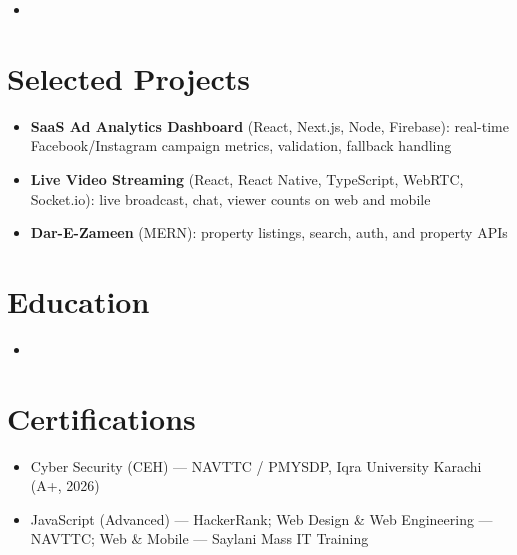 \documentclass[11pt,a4paper,sans]{moderncv}
\begin{document}
\begin{itemize}
\vspace{3pt}

\item{}

\end{itemize}

\section{Selected Projects}
\vspace{1pt}
\begin{itemize}
\item \textbf{SaaS Ad Analytics Dashboard} (React, Next.js, Node, Firebase): real-time Facebook/Instagram campaign metrics, validation, fallback handling
\item \textbf{Live Video Streaming} (React, React Native, TypeScript, WebRTC, Socket.io): live broadcast, chat, viewer counts on web and mobile
\item \textbf{Dar-E-Zameen} (MERN): property listings, search, auth, and property APIs
\end{itemize}

\section{Education}
\vspace{1pt}
\begin{itemize}
\item{}
\end{itemize}

\section{Certifications}
\vspace{1pt}
\begin{itemize}
\item Cyber Security (CEH) --- NAVTTC / PMYSDP, Iqra University Karachi (A+, 2026)
\item JavaScript (Advanced) --- HackerRank; Web Design \& Web Engineering --- NAVTTC; Web \& Mobile --- Saylani Mass IT Training
\end{itemize}
\end{document}
